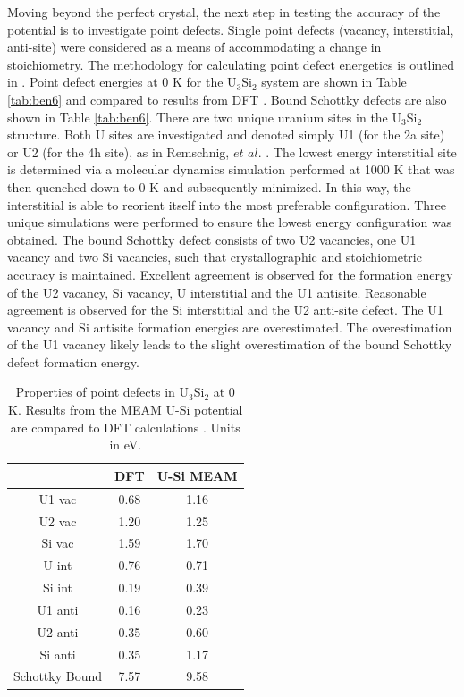 \documentclass[review]{elsarticle}
\begin{document}
\FloatBarrier

Moving beyond the perfect crystal, the next step in testing the accuracy of the potential is to investigate point defects.  Single point defects (vacancy, interstitial, anti-site) were considered as a means of accommodating a change in stoichiometry.  The methodology for calculating point defect energetics is outlined in \cite{middleburgh2016}.  Point defect energies at 0 K for the U$_{3}$Si$_{2}$ system are shown in Table \ref{tab:ben6} and compared to results from DFT \cite{middleburgh2016}.  Bound Schottky defects are also shown in Table \ref{tab:ben6}.  There are two unique uranium sites in the U$_{3}$Si$_{2}$ structure.  Both U sites are investigated and denoted simply U1 (for the 2a site) or U2 (for the 4h site), as in Remschnig, $\textit{et al.}$ \cite{remschnig1992}.  The lowest energy interstitial site is determined via a molecular dynamics simulation performed at 1000 K that was then quenched down to 0 K and subsequently minimized.   In this way, the interstitial is able to reorient itself into the most preferable configuration.  Three unique simulations were performed to ensure the lowest energy configuration was obtained.  The bound Schottky defect consists of two U2 vacancies, one U1 vacancy and two Si vacancies, such that crystallographic and stoichiometric accuracy is maintained.  Excellent agreement is observed for the formation energy of the U2 vacancy, Si vacancy, U interstitial and the U1 antisite.  Reasonable agreement is observed for the Si interstitial and the U2 anti-site defect.  The U1 vacancy and Si antisite formation energies are overestimated.  The overestimation of the U1 vacancy likely leads to the slight overestimation of the bound Schottky defect formation energy.  

\begin{table}[h!]
\caption{Properties of point defects in U$_{3}$Si$_{2}$ at 0 K.  Results from the MEAM U-Si potential are compared to DFT calculations \cite{middleburgh2016}.  Units in eV.}\label{tab:ben6}
\begin{center}
\begin{tabular}{|c|c|c|}
     \hline
      &  DFT & U-Si MEAM \\
     \hline
     U1 vac & 0.68 & 1.16 \\
     U2 vac & 1.20 & 1.25 \\
     Si vac & 1.59 & 1.70 \\
     U int & 0.76 & 0.71 \\
     Si int & 0.19 & 0.39 \\
     U1 anti & 0.16 & 0.23 \\
     U2 anti & 0.35 & 0.60 \\
     Si anti & 0.35 & 1.17 \\
     Schottky Bound & 7.57 & 9.58  \\
     \hline
\end{tabular}
\end{center}
\label{default}
\end{table}%
\end{document}
